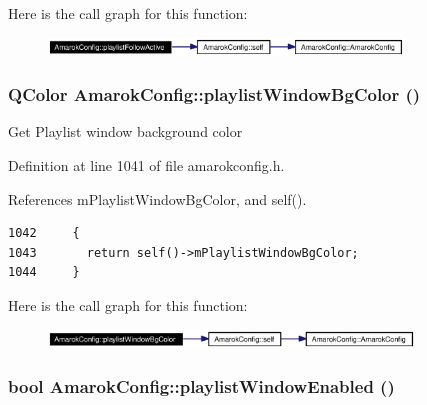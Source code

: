 Here is the call graph for this function:\begin{figure}[H]
\begin{center}
\leavevmode
\includegraphics[width=267pt]{classAmarokConfig_AmarokConfige48_cgraph}
\end{center}
\end{figure}
\subsubsection{\setlength{\rightskip}{0pt plus 5cm}QColor Amarok\-Config::playlist\-Window\-Bg\-Color ()\hspace{0.3cm}{\tt  [inline, static]}}\label{classAmarokConfig_AmarokConfige108}


Get Playlist window background color 

Definition at line 1041 of file amarokconfig.h.

References m\-Playlist\-Window\-Bg\-Color, and self().



\footnotesize\begin{verbatim}1042     {
1043       return self()->mPlaylistWindowBgColor;
1044     }
\end{verbatim}\normalsize 


Here is the call graph for this function:\begin{figure}[H]
\begin{center}
\leavevmode
\includegraphics[width=275pt]{classAmarokConfig_AmarokConfige108_cgraph}
\end{center}
\end{figure}
\subsubsection{\setlength{\rightskip}{0pt plus 5cm}bool Amarok\-Config::playlist\-Window\-Enabled ()\hspace{0.3cm}{\tt  [inline, static]}}\label{classAmarokConfig_AmarokConfige38}


